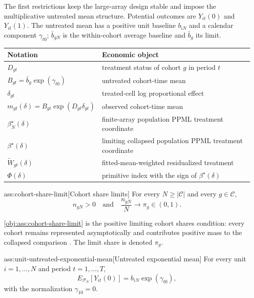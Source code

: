\documentclass[11pt]{article}
\begin{document}
The first restrictions keep the large-array design stable and impose the multiplicative untreated mean structure. Potential outcomes are \(Y_{it}(0)\) and \(Y_{it}(1)\). The untreated mean has a positive unit baseline \(b_{iN}\) and a calendar component \(\gamma_{t0}\); \(\bar b_{gN}\) is the within-cohort average baseline and \(\bar b_g\) its limit.

\begin{center}
\begin{tabular}{ll}
\hline
Notation & Economic object\\
\hline
\(D_{gt}\) & treatment status of cohort \(g\) in period \(t\)\\
\(B_{gt}=\bar b_g\exp(\gamma_{t0})\) & untreated cohort-time mean\\
\(\delta_{gt}\) & treated-cell log proportional effect\\
\(m_{gt}(\delta)=B_{gt}\exp(D_{gt}\delta_{gt})\) & observed cohort-time mean\\
\(\beta_N^\star(\delta)\) & finite-array population PPML treatment coordinate\\
\(\beta^\star(\delta)\) & limiting collapsed population PPML treatment coordinate\\
\(\widetilde W_{gt}(\delta)\) & fitted-mean-weighted residualized treatment\\
\(\Phi(\delta)\) & primitive index with the sign of \(\beta^\star(\delta)\)\\
\hline
\end{tabular}
\end{center}

\begin{assumptionv}{ass:cohort-share-limit}[Cohort share limits]
For every \(N\ge |\mathcal C|\) and every \(g\in\mathcal C\),
\[
n_{gN}>0
\quad\text{and}\quad
\frac{n_{gN}}{N}\to \pi_g\in(0,1).
\]
\end{assumptionv}

\cref{obj:ass:cohort-share-limit} is the positive limiting cohort shares condition: every cohort remains represented asymptotically and contributes positive mass to the collapsed comparison \citep{deChaisemartinDHaultfoeuille2020TWFE}. The limit share is denoted \(\pi_g\).

\begin{assumptionv}{ass:unit-untreated-exponential-mean}[Untreated exponential mean]
For every unit \(i=1,\ldots,N\) and period \(t=1,\ldots,T\),
\[
E_{\mathcal P_N}\!\left[Y_{it}(0)\right]
=
b_{iN}\exp(\gamma_{t0}),
\]
with the normalization \(\gamma_{10}=0\).
\end{assumptionv}
\end{document}
